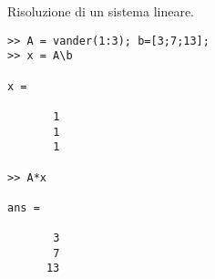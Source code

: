 \begin{exe}Risoluzione di un sistema lineare.

\begin{codice}
\begin{verbatim}
>> A = vander(1:3); b=[3;7;13];
>> x = A\b

x =

       1       
       1       
       1       

>> A*x

ans =

       3       
       7       
      13       

\end{verbatim}
\end{codice}

\end{exe}

